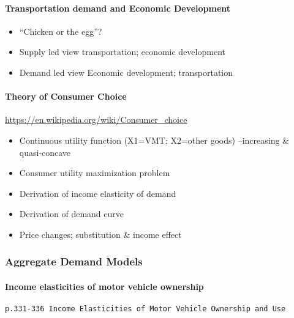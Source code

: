 \documentclass[]{article}
\providecommand{\tightlist}{%
  \setlength{\itemsep}{0pt}\setlength{\parskip}{0pt}}
\let\oldparagraph\paragraph
\renewcommand{\paragraph}[1]{\oldparagraph{#1}\mbox{}}
\begin{document}
\hypertarget{transportation-demand-and-economic-development}{%
\paragraph{Transportation demand and Economic
Development}\label{transportation-demand-and-economic-development}}

\begin{itemize}
\tightlist
\item
  ``Chicken or the egg''?
\item
  Supply led view transportation; economic development
\item
  Demand led view Economic development; transportation
\end{itemize}

\hypertarget{theory-of-consumer-choice}{%
\paragraph{Theory of Consumer Choice}\label{theory-of-consumer-choice}}

\url{https://en.wikipedia.org/wiki/Consumer_choice}

\begin{itemize}
\tightlist
\item
  Continuous utility function (X1=VMT; X2=other goods) --increasing \&
  quasi-concave
\item
  Consumer utility maximization problem
\item
  Derivation of income elasticity of demand
\item
  Derivation of demand curve
\item
  Price changes; substitution \& income effect
\end{itemize}

\hypertarget{aggregate-demand-models}{%
\subsubsection{Aggregate Demand Models}\label{aggregate-demand-models}}

\hypertarget{income-elasticities-of-motor-vehicle-ownership}{%
\paragraph{Income elasticities of motor vehicle
ownership}\label{income-elasticities-of-motor-vehicle-ownership}}

\texttt{p.331-336\ Income\ Elasticities\ of\ Motor\ Vehicle\ Ownership\ and\ Use}
\end{document}

